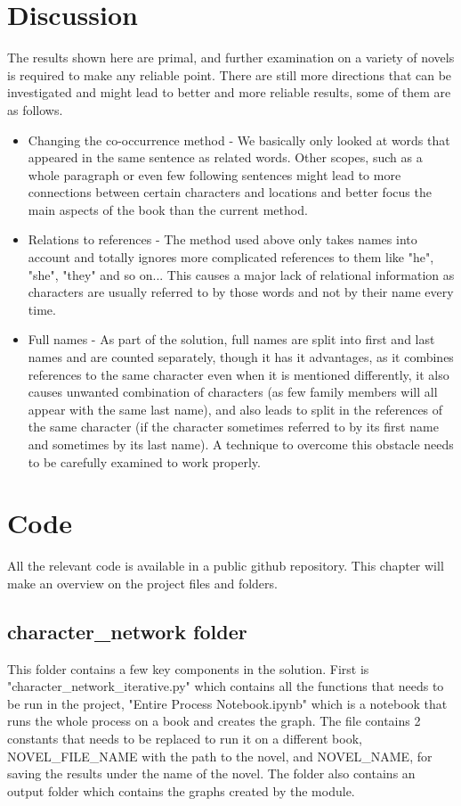 \documentclass{article}
\begin{document}
\section{Discussion}
The results shown here are primal, and further examination on a variety of novels is required to make any reliable point. There are still more directions that can be investigated and might lead to better and more reliable results, some of them are as follows.
\begin{itemize}
  \item Changing the co-occurrence method - We basically only looked at words that appeared in the same sentence as related words. Other scopes, such as a whole paragraph or even few following sentences might lead to more connections between certain characters and locations and better focus the main aspects of the book than the current method.
  \item Relations to references - The method used above only takes names into account and totally ignores more complicated references to them like "he", "she", "they" and so on... This causes a major lack of relational information as characters are usually referred to by those words and not by their name every time.
  \item Full names - As part of the solution, full names are split into first and last names and are counted separately, though it has it advantages, as it combines references to the same character even when it is mentioned differently, it also causes unwanted combination of characters (as few family members will all appear with the same last name), and also leads to split in the references of the same character (if the character sometimes referred to by its first name and sometimes by its last name). A technique to overcome this obstacle needs to be carefully examined to work properly.
\end{itemize}

\section{Code}
All the relevant code is available in a public github repository\cite{project2020}. This chapter will make an overview on the project files and folders.

\subsection{character\_network folder}
This folder contains a few key components in the solution. First is "character\_network\_iterative.py" which contains all the functions that needs to be run in the project, "Entire Process Notebook.ipynb" which is a notebook that runs the whole process on a book and creates the graph. The file contains 2 constants that needs to be replaced to run it on a different book, NOVEL\_FILE\_NAME with the path to the novel, and NOVEL\_NAME, for saving the results under the name of the novel. The folder also contains an output folder which contains the graphs created by the module.
\end{document}
